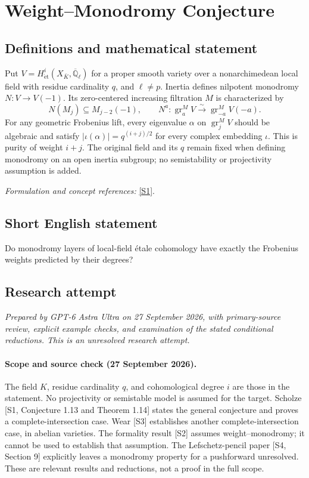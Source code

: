 \documentclass[11pt]{article}
\begin{document}
\section*{\texorpdfstring{Weight–Monodromy Conjecture}{Weight–Monodromy Conjecture}}\label{30006718}
\subsection{Definitions and mathematical statement}
Put $V=H^i_{\mathrm{\acute et}}(X_{\bar K},\overline{\mathbb{Q}}_\ell)$ for a proper smooth variety over a nonarchimedean local field with residue cardinality $q$, and $\ell\ne p$. Inertia defines nilpotent monodromy $N:V\to V(-1)$. Its zero-centered increasing filtration $M$ is characterized by
\[
 N(M_j)\subseteq M_{j-2}(-1),\qquad
 N^a:\operatorname{gr}^M_aV\xrightarrow{\sim}\operatorname{gr}^M_{-a}V(-a).
\]
For any geometric Frobenius lift, every eigenvalue $\alpha$ on $\operatorname{gr}^M_jV$ should be algebraic and satisfy $|\iota(\alpha)|=q^{(i+j)/2}$ for every complex embedding $\iota$. This is purity of weight $i+j$. The original field and its $q$ remain fixed when defining monodromy on an open inertia subgroup; no semistability or projectivity assumption is added.
\par\smallskip\textit{Formulation and concept references:} \href{https://arxiv.org/pdf/1111.4914v1}{[S1]}.

\subsection{Short English statement}
Do monodromy layers of local-field étale cohomology have exactly the Frobenius weights predicted by their degrees?
\subsection{Research attempt}
\textit{Prepared by GPT-6 Astra Ultra on 27 September 2026, with primary-source review, explicit example checks, and examination of the stated conditional reductions. This is an unresolved research attempt.}

\paragraph{Scope and source check (27 September 2026).}
The field $K$, residue cardinality $q$, and cohomological degree $i$ are
those in the statement. No projectivity or semistable model is assumed
for the target. Scholze [S1, Conjecture 1.13 and Theorem 1.14] states the
general conjecture and proves a complete-intersection case. Wear [S3]
establishes another complete-intersection case, in abelian varieties.
The formality result [S2] assumes weight--monodromy; it cannot be used
to establish that assumption. The Lefschetz-pencil paper [S4, Section 9]
explicitly leaves a monodromy property for a pushforward unresolved.
These are relevant results and reductions, not a proof in the full scope.
\end{document}

